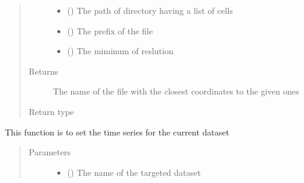 \documentclass[letterpaper,10pt,english]{sphinxmanual}
\begin{document}
\begin{fulllineitems}
\begin{fulllineitems}
\begin{quote}
\begin{description}
\begin{itemize}
\item {} 
 () \textendash{} The path of directory having a list of cells

\item {} 
 () \textendash{} The prefix of the file

\item {} 
 () \textendash{} The miminum of reslution

\end{itemize}

\item[{Returns}] \leavevmode
The name of the file with the closest coordinates to the given ones

\item[{Return type}] \leavevmode
{}

\end{description}\end{quote}

\end{fulllineitems}


\begin{fulllineitems}
\label{\detokenize{AgentTools.util:AgentTools.util.OutputUtil.OutputUtil.set_time_series_to_dataset}}
This function is to set the time series for the current dataset
\begin{quote}\begin{description}
\item[{Parameters}] \leavevmode\begin{itemize}
\item {} 
 () \textendash{} The name of the targeted dataset


\end{itemize}
\end{description}
\end{quote}
\end{fulllineitems}
\end{fulllineitems}
\end{document}
